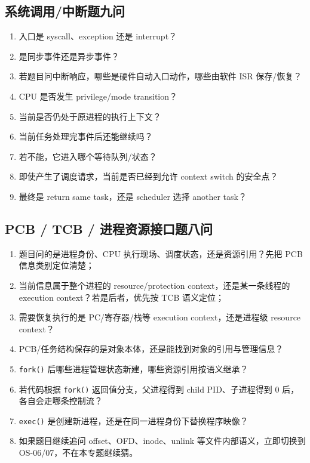 \documentclass[11pt,a4paper]{ctexart}
\newcommand{\code}[1]{\texttt{#1}}
\begin{document}
\subsection{系统调用/中断题九问}
\begin{enumerate}
\item 入口是 syscall、exception 还是 interrupt？
\item 是同步事件还是异步事件？
\item 若题目问中断响应，哪些是硬件自动入口动作，哪些由软件 ISR 保存/恢复？
\item CPU 是否发生 privilege/mode transition？
\item 当前是否仍处于原进程的执行上下文？
\item 当前任务处理完事件后还能继续吗？
\item 若不能，它进入哪个等待队列/状态？
\item 即使产生了调度请求，当前是否已经到允许 context switch 的安全点？
\item 最终是 return same task，还是 scheduler 选择 another task？
\end{enumerate}

\subsection{PCB / TCB / 进程资源接口题八问}
\begin{enumerate}
\item 题目问的是进程身份、CPU 执行现场、调度状态，还是资源引用？先把 PCB 信息类别定位清楚；
\item 当前信息属于整个进程的 resource/protection context，还是某一条线程的 execution context？若是后者，优先按 TCB 语义定位；
\item 需要恢复执行的是 PC/寄存器/栈等 execution context，还是进程级 resource context？
\item PCB/任务结构保存的是对象本体，还是能找到对象的引用与管理信息？
\item \code{fork()} 后哪些进程管理状态新建，哪些资源引用按语义继承？
\item 若代码根据 \code{fork()} 返回值分支，父进程得到 child PID、子进程得到 0 后，各自会走哪条控制流？
\item \code{exec()} 是创建新进程，还是在同一进程身份下替换程序映像？
\item 如果题目继续追问 offset、OFD、inode、unlink 等文件内部语义，立即切换到 OS-06/07，不在本专题继续猜。
\end{enumerate}
\end{document}
